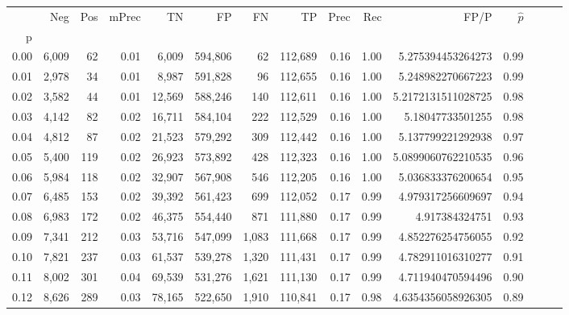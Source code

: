 \begin{tabular}{rrrrrrrrrrrrrrr}
\toprule
{} &     Neg &    Pos & mPrec &       TN &       FP &       FN &       TP &  Prec &   Rec &                   FP/P & $\hat{p}$ \\
p    &         &        &       &          &          &          &          &       &       &                        &           \\
\midrule
0.00 &   6,009 &     62 &  0.01 &    6,009 &  594,806 &       62 &  112,689 &  0.16 &  1.00 &      5.275394453264273 &      0.99 \\
0.01 &   2,978 &     34 &  0.01 &    8,987 &  591,828 &       96 &  112,655 &  0.16 &  1.00 &      5.248982270667223 &      0.99 \\
0.02 &   3,582 &     44 &  0.01 &   12,569 &  588,246 &      140 &  112,611 &  0.16 &  1.00 &     5.2172131511028725 &      0.98 \\
0.03 &   4,142 &     82 &  0.02 &   16,711 &  584,104 &      222 &  112,529 &  0.16 &  1.00 &       5.18047733501255 &      0.98 \\
0.04 &   4,812 &     87 &  0.02 &   21,523 &  579,292 &      309 &  112,442 &  0.16 &  1.00 &      5.137799221292938 &      0.97 \\
0.05 &   5,400 &    119 &  0.02 &   26,923 &  573,892 &      428 &  112,323 &  0.16 &  1.00 &     5.0899060762210535 &      0.96 \\
0.06 &   5,984 &    118 &  0.02 &   32,907 &  567,908 &      546 &  112,205 &  0.16 &  1.00 &      5.036833376200654 &      0.95 \\
0.07 &   6,485 &    153 &  0.02 &   39,392 &  561,423 &      699 &  112,052 &  0.17 &  0.99 &      4.979317256609697 &      0.94 \\
0.08 &   6,983 &    172 &  0.02 &   46,375 &  554,440 &      871 &  111,880 &  0.17 &  0.99 &         4.917384324751 &      0.93 \\
0.09 &   7,341 &    212 &  0.03 &   53,716 &  547,099 &    1,083 &  111,668 &  0.17 &  0.99 &      4.852276254756055 &      0.92 \\
0.10 &   7,821 &    237 &  0.03 &   61,537 &  539,278 &    1,320 &  111,431 &  0.17 &  0.99 &      4.782911016310277 &      0.91 \\
0.11 &   8,002 &    301 &  0.04 &   69,539 &  531,276 &    1,621 &  111,130 &  0.17 &  0.99 &      4.711940470594496 &      0.90 \\
0.12 &   8,626 &    289 &  0.03 &   78,165 &  522,650 &    1,910 &  110,841 &  0.17 &  0.98 &     4.6354356058926305 &      0.89 \\

\end{tabular}
